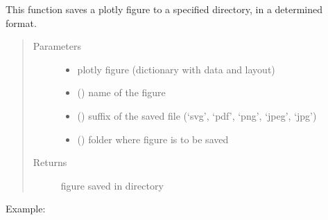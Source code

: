 \documentclass[letterpaper,10pt,english]{sphinxmanual}
\begin{document}
\begin{fulllineitems}
\label{\detokenize{_autosummary/analytics_core.viz:analytics_core.viz.viz.save_DASH_plot}}
This function saves a plotly figure to a specified directory, in a determined format.
\begin{quote}\begin{description}
\item[{Parameters}] \leavevmode\begin{itemize}
\item {} 
 \textendash{} plotly figure (dictionary with data and layout)

\item {} 
 () \textendash{} name of the figure

\item {} 
 () \textendash{} suffix of the saved file (‘svg’, ‘pdf’, ‘png’, ‘jpeg’, ‘jpg’)

\item {} 
 () \textendash{} folder where figure is to be saved

\end{itemize}

\item[{Returns}] \leavevmode
figure saved in directory

\end{description}\end{quote}

Example:

\begin{sphinxVerbatim}[commandchars=\\\{\}]
     
\end{sphinxVerbatim}

\end{fulllineitems}
\end{document}

